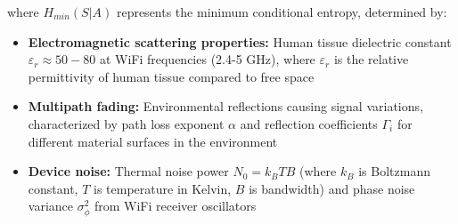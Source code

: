 \documentclass[12pt,a4paper]{article}
\begin{document}
where $H_{min}(S|A)$ represents the minimum conditional entropy, determined by:
\begin{itemize}
\item \textbf{Electromagnetic scattering properties:} Human tissue dielectric constant $\varepsilon_r \approx 50-80$ at WiFi frequencies (2.4-5 GHz), where $\varepsilon_r$ is the relative permittivity of human tissue compared to free space
\item \textbf{Multipath fading:} Environmental reflections causing signal variations, characterized by path loss exponent $\alpha$ and reflection coefficients $\Gamma_i$ for different material surfaces in the environment
\item \textbf{Device noise:} Thermal noise power $N_0 = k_B T B$ (where $k_B$ is Boltzmann constant, $T$ is temperature in Kelvin, $B$ is bandwidth) and phase noise variance $\sigma_{\phi}^2$ from WiFi receiver oscillators
\end{itemize}
\end{document}
